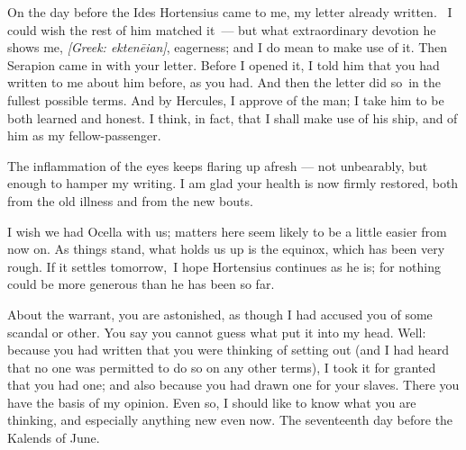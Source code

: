 

 On the day before the Ides Hortensius came to me, my letter already written. \dag\ I could wish the rest of him matched it\dag\ --- but what extraordinary devotion he shows me, \textit{[Greek: ekten\=eian]}, eagerness; and I do mean to make use of it. Then Serapion came in with your letter. Before I opened it, I told him that you had written to me about him before, as you had. And then the letter \dag did so\dag\ in the fullest possible terms. And by Hercules, I approve of the man; I take him to be both learned and honest. I think, in fact, that I shall make use of his ship, and of him as my fellow-passenger.

 The inflammation of the eyes keeps flaring up afresh --- not unbearably, but enough to hamper my writing. I am glad your health is now firmly restored, both from the old illness and from the new bouts.

 I wish we had Ocella with us; matters here seem likely to be a little easier from now on. As things stand, what holds us up is the equinox, which has been very rough. \dag If it settles tomorrow,\dag\ I hope Hortensius continues as he is; for nothing could be more generous than he has been so far.

 About the warrant, you are astonished, as though I had accused you of some scandal or other. You say you cannot guess what put it into my head. Well: because you had written that you were thinking of setting out (and I had heard that no one was permitted to do so on any other terms), I took it for granted that you had one; and also because you had drawn one for your slaves. There you have the basis of my opinion. Even so, I should like to know what you are thinking, and especially anything new even now. The seventeenth day before the Kalends of June.
